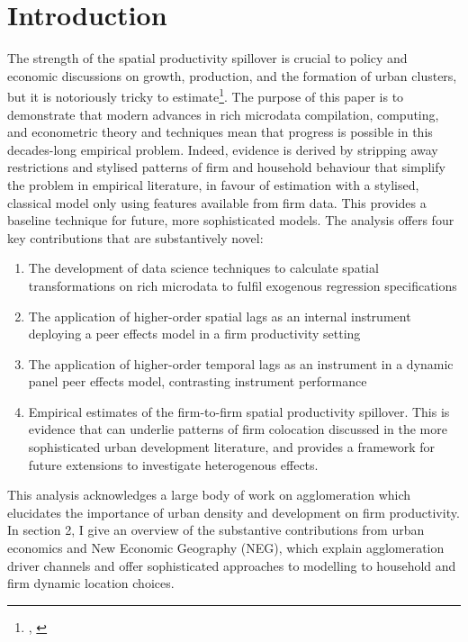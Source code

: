 \section{Introduction}
\label{s:intro}

The strength of the spatial productivity spillover
is crucial to policy and economic discussions on growth, production,
and the formation of urban clusters, but it is notoriously tricky to
estimate\footnote{\cite{Krugman1998}, \cite{Fujita2004}}.
The purpose of this paper is to demonstrate that modern advances in
rich microdata compilation, computing, and econometric theory and techniques
mean that progress is possible in this decades-long empirical problem.
Indeed, evidence is derived by stripping away restrictions
and stylised patterns of firm and household behaviour that simplify
the problem in empirical literature,
in favour of estimation with a stylised, classical model
only using features available from firm data.
This provides a baseline technique for future, more sophisticated models.
The analysis offers four key contributions that are substantively novel:
\begin{enumerate}
    \item The development of data science techniques to calculate spatial transformations
            on rich microdata to fulfil exogenous regression specifications
    \item The application of higher-order spatial lags as an internal instrument
            deploying a peer effects model in a firm productivity setting
    \item The application of higher-order temporal lags as an instrument
            in a dynamic panel peer effects model,
            contrasting instrument performance
    \item Empirical estimates of the firm-to-firm spatial productivity spillover.
    This is evidence that can underlie patterns of firm colocation discussed
    in the more sophisticated urban development literature,
    and provides a framework for future extensions to investigate heterogenous effects.
\end{enumerate}
\par %
This analysis acknowledges a large body of work on agglomeration
which elucidates the importance of
urban density and development on firm productivity.
In section 2, I give an overview of the substantive contributions from
urban economics and New Economic Geography (NEG),
which explain agglomeration driver channels
and offer sophisticated approaches to modelling to household and firm dynamic location choices.
